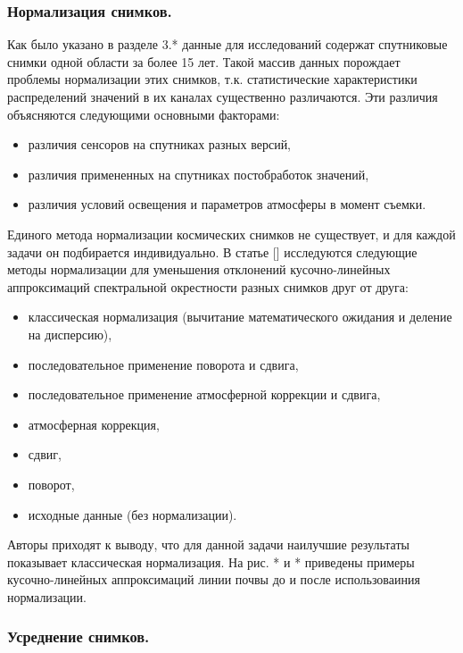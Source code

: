 \documentclass[12pt]{article}
\begin{document}
\subsubsection{Нормализация снимков.}

\par
Как было указано в разделе {\color{red} 3.*} данные для исследований содержат спутниковые снимки
одной области за более 15 лет. Такой массив данных порождает проблемы нормализации этих снимков,
т.к. статистические характеристики распределений значений в их каналах существенно различаются.
Эти различия объясняются следующими основными факторами:
\begin{itemize}
\item различия сенсоров на спутниках разных версий,
\item различия примененных на спутниках постобработок значений,
\item различия условий освещения и параметров атмосферы в момент съемки.
\end{itemize}
\par
Единого метода нормализации космических снимков не существует, и для каждой задачи он
подбирается индивидуально. В статье {\color{red}[]} исследуются следующие методы нормализации
для уменьшения отклонений кусочно-линейных аппроксимаций спектральной окрестности 
разных снимков друг от друга:
\begin{itemize}
\item классическая нормализация (вычитание математического ожидания и деление на дисперсию),
\item последовательное применение поворота и сдвига,
\item последовательное применение атмосферной коррекции и сдвига,
\item атмосферная коррекция,
\item сдвиг,
\item поворот,
\item исходные данные (без нормализации).
\end{itemize}
Авторы приходят к выводу, что для данной задачи наилучшие результаты 
показывает классическая нормализация. На рис. {\color{red}* и *} приведены примеры
кусочно-линейных аппроксимаций линии почвы до и после использоваиния нормализации.

\subsubsection{Усреднение снимков.}
\end{document}
